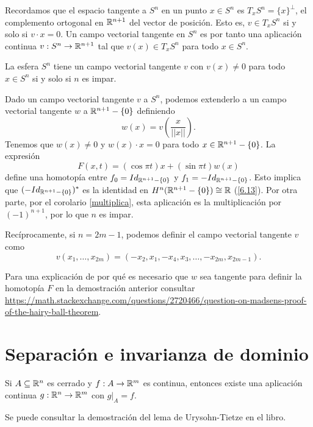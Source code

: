 \documentclass[CV.tex]{subfiles}
\begin{document}
Recordamos que el espacio tangente a $S^n$ en un punto $x\in S^n$ es $T_xS^n=\{x\}^{\perp}$, el complemento ortogonal en $\mathbb{R}^{n+1}$ del vector de posición. Esto es, $v\in T_xS^n$ si y solo si $v\cdot x=0$. Un campo vectorial tangente en $S^n$ es por tanto una aplicación continua $v:S^n\to\mathbb{R}^{n+1}$ tal que $v(x)\in T_xS^n$ para todo $x\in S^n$. 

\begin{teorema}
La esfera $S^n$ tiene un campo vectorial tangente $v$ con $v(x)\neq 0$ para todo $x\in S^n$ si y solo si $n$ es impar.
\end{teorema}
\begin{dem}
Dado un campo vectorial tangente $v$ a $S^n$, podemos extenderlo a un campo vectorial tangente $w$ a $\mathbb{R}^{n+1}-\{0\}$ definiendo
\[
w(x)=v\left(\frac{x}{||x||}\right).
\] 
Tenemos que $w(x)\neq 0$ y $w(x)\cdot x=0$ para todo $x\in\mathbb{R}^{n+1}-\{0\}$. La expresión
\[
F(x,t)=(\cos\pi t)x+(\sin\pi t)w(x)
\]
define una homotopía entre $f_0=Id_{\mathbb{R}^{n+1}-\{0\}}$ y $f_1=-Id_{\mathbb{R}^{n+1}-\{0\}}$. Esto implica que $(-Id_{\mathbb{R}^{n+1}-\{0\}})^*$ es la identidad en $H^n(\mathbb{R}^{n+1}-\{0\})\cong\mathbb{R}$ (\ref{6.13}). Por otra parte, por el corolario \ref{multiplica}, esta aplicación es la multiplicación por $(-1)^{n+1}$, por lo que $n$ es impar. 

Recíprocamente, si $n=2m-1$, podemos definir el campo vectorial tangente $v$ como
\[
v(x_1,\dots, x_{2m})=(-x_2, x_1,-x_4,x_3,\dots, -x_{2m},x_{2m-1}).
\]
\QED
\end{dem}
\begin{nota}
Para una explicación de por qué es necesario que $w$ sea tangente para definir la homotopía $F$ en la demostración anterior consultar \url{https://math.stackexchange.com/questions/2720466/question-on-madsens-proof-of-the-hairy-ball-theorem}.
\end{nota}


\section{Separación e invarianza de dominio}


\begin{lemma}\label{Urysohn} Si $A\subseteq \mathbb{R}^n$ es cerrado y $f:A\to\mathbb{R}^m$ es continua, entonces existe una aplicación continua $g:\mathbb{R}^n\to\mathbb{R}^m$ con $g|_A=f$.
\end{lemma}

Se puede consultar la demostración del lema de Urysohn-Tietze en el libro.
\end{document}

